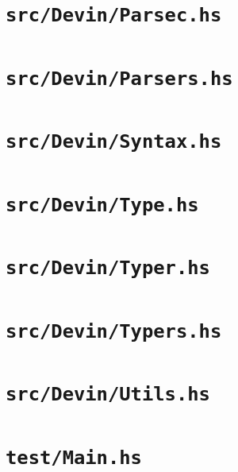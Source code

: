 \documentclass[UdineBachThesis,american,11pt]{PhdThesis}
\begin{document}
  

  \section{\texttt{src/Devin/Parsec.hs}}

  

  \section{\texttt{src/Devin/Parsers.hs}}

  

  \section{\texttt{src/Devin/Syntax.hs}}

  

  \section{\texttt{src/Devin/Type.hs}}

  

  \section{\texttt{src/Devin/Typer.hs}}

  

  \section{\texttt{src/Devin/Typers.hs}}

  

  \section{\texttt{src/Devin/Utils.hs}}

  

  \section{\texttt{test/Main.hs}}
\end{document}
